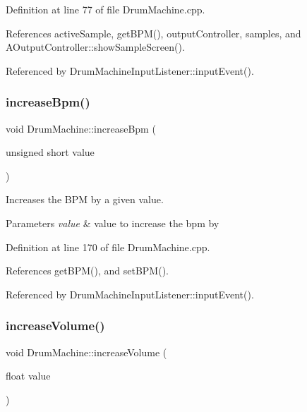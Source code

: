 Definition at line 77 of file Drum\+Machine.\+cpp.



References active\+Sample, get\+B\+P\+M(), output\+Controller, samples, and A\+Output\+Controller\+::show\+Sample\+Screen().



Referenced by Drum\+Machine\+Input\+Listener\+::input\+Event().

\mbox{\label{class_drum_machine_adbaa7d80f7aa34f1ca190e163515e3e6}} 
\subsubsection{\texorpdfstring{increase\+Bpm()}{increaseBpm()}}
{\footnotesize\ttfamily void Drum\+Machine\+::increase\+Bpm (\begin{DoxyParamCaption}\item[{unsigned short}]{value }\end{DoxyParamCaption})}

Increases the B\+PM by a given value. 
\begin{DoxyParams}{Parameters}
{\em value} & value to increase the bpm by \\
\hline
\end{DoxyParams}


Definition at line 170 of file Drum\+Machine.\+cpp.



References get\+B\+P\+M(), and set\+B\+P\+M().



Referenced by Drum\+Machine\+Input\+Listener\+::input\+Event().

\mbox{\label{class_drum_machine_ab823055aa6c1fa1dd91b1e45f3e66f0f}} 
\subsubsection{\texorpdfstring{increase\+Volume()}{increaseVolume()}}
{\footnotesize\ttfamily void Drum\+Machine\+::increase\+Volume (\begin{DoxyParamCaption}\item[{float}]{value }\end{DoxyParamCaption})}

